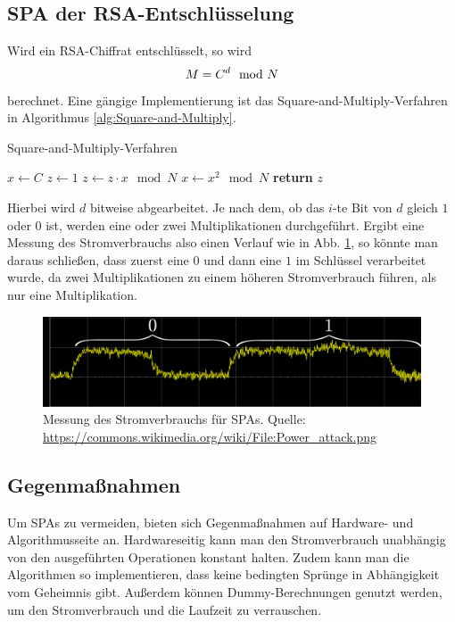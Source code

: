\subsection{SPA der RSA-Entschlüsselung}
Wird ein RSA-Chiffrat entschlüsselt, so wird \[M
  =C^d \mod N\] berechnet. Eine gängige Implementierung ist das
Square-and-Multiply-Verfahren in Algorithmus \ref{alg:Square-and-Multiply}. 
\begin{algorithm}[!h]
\caption{Square-and-Multiply-Verfahren}
\label{alg:Square-and-Multiply}
\begin{algorithmic}

  \State $x \gets C$
  \State $z \gets 1$
      \State $z \gets z \cdot x \mod N$
    \EndIf
    \State $x \gets x^2 \mod N$
  \EndFor
  \State \textbf{return} $z$
\EndProcedure
\end{algorithmic}
\end{algorithm}

Hierbei wird $d$ bitweise abgearbeitet. Je nach dem, ob das $i$-te Bit
von $d$ gleich $1$ oder $0$ ist, werden eine oder zwei Multiplikationen
durchgeführt. Ergibt eine Messung des Stromverbrauchs also einen Verlauf
wie in Abb. \ref{abb:power-attack}, so könnte man daraus schließen,
dass zuerst eine $0$ und dann eine $1$ im Schlüssel verarbeitet wurde,
da zwei Multiplikationen zu einem höheren Stromverbrauch führen, als nur
eine Multiplikation.

\begin{figure}[h]
  \centering
  \includegraphics[width=\textwidth]{images/Power_attack}
  \caption{Messung des Stromverbrauchs für SPAs. Quelle: \url{https://commons.wikimedia.org/wiki/File:Power_attack.png}}
  \label{abb:power-attack}
\end{figure}

\subsection{Gegenmaßnahmen}
Um SPAs zu vermeiden, bieten sich Gegenmaßnahmen auf Hardware- und
Algorithmusseite an. Hardwareseitig kann man den Stromverbrauch
unabhängig von den ausgeführten Operationen konstant halten. Zudem kann
man die Algorithmen so implementieren, dass keine bedingten Sprünge
in Abhängigkeit vom Geheimnis gibt. Außerdem können Dummy-Berechnungen
genutzt werden, um den Stromverbrauch und die Laufzeit  zu verrauschen.

